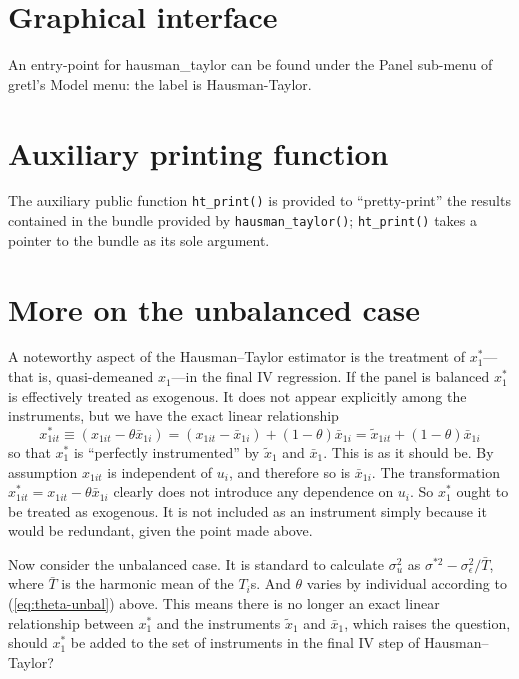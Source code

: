 \documentclass{article}
\begin{document}
\section{Graphical interface}

An entry-point for \textsf{hausman\_taylor} can be found under the
\textsf{Panel} sub-menu of gretl's \textsf{Model} menu: the label is
\textsf{Hausman-Taylor}.


\section{Auxiliary printing function}

The auxiliary public function \texttt{ht\_print()} is provided to
``pretty-print'' the results contained in the bundle provided by
\texttt{hausman\_taylor()}; \texttt{ht\_print()} takes a pointer to
the bundle as its sole argument.

\section{More on the unbalanced case}
\label{sec:unbal}

A noteworthy aspect of the Hausman--Taylor estimator is the treatment
of $x_1^*$---that is, quasi-demeaned $x_1$---in the final IV
regression. If the panel is balanced $x_1^*$ is effectively treated as
exogenous. It does not appear explicitly among the instruments, but we
have the exact linear relationship
\[
x^*_{1it} \equiv (x_{1it} -\theta \bar{x}_{1i}) = 
  (x_{1it} - \bar{x}_{1i}) + (1-\theta) \bar{x}_{1i}
 = \tilde{x}_{1it} + (1-\theta) \bar{x}_{1i}
\]
so that $x_1^*$ is ``perfectly instrumented'' by $\tilde{x}_{1}$ and
$\bar{x}_1$. This is as it should be. By assumption $x_{1it}$ is
independent of $u_i$, and therefore so is $\bar{x}_{1i}$. The
transformation $x^*_{1it} = x_{1it} - \theta \bar{x}_{1i}$ clearly
does not introduce any dependence on $u_i$. So $x_1^*$ ought to be
treated as exogenous. It is not included as an instrument simply
because it would be redundant, given the point made above.

Now consider the unbalanced case. It is standard to calculate
$\sigma^2_u$ as $\sigma^{*2} - \sigma^2_{\epsilon}/\bar{T}$, where
$\bar{T}$ is the harmonic mean of the $T_i$s. And $\theta$ varies by
individual according to (\ref{eq:theta-unbal}) above.  This means
there is no longer an exact linear relationship between $x_1^*$ and
the instruments $\tilde{x}_1$ and $\bar{x}_1$, which raises the
question, should $x_1^*$ be added to the set of instruments in the
final IV step of Hausman--Taylor?
\end{document}
